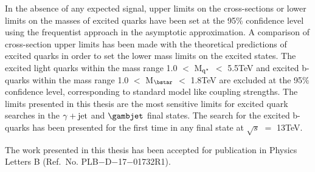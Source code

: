 In the absence of any expected signal, upper limits on the cross-sections or lower limits on the masses of excited quarks have been set at the 95$\%$ confidence level
using the frequentist approach in the asymptotic approximation. A comparison of cross-section upper limits has been made with the theoretical predictions of
excited quarks in order to set the lower mass limits on the excited states. The excited light quarks within the mass range
1.0 $<$ M$_{\mathrm{q^\star}}$ $<$ 5.5\unit{TeV} and excited b-quarks within the mass range 1.0 $<$ M$_{\bstar}$ $<$ 1.8\unit{TeV} are excluded at the 95$\%$ confidence level,
corresponding to standard model like coupling strengths. The limits presented in this thesis are the most
sensitive limits for excited quark searches in the $\gamma+\mathrm{jet}$ and $\gambjet$ final states. The search for the excited b-quarks has been presented for the first time
in any final state at $\sqrt{s}$ $=$ 13\unit{TeV}.

The work presented in this thesis has been accepted for publication in Physics Letters B (Ref.\ No.\: PLB$-$D$-$17$-$01732R1).



